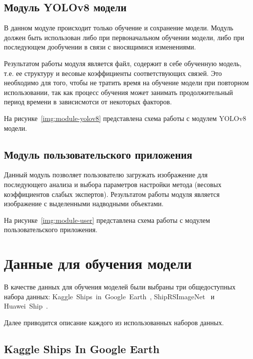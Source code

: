 \subsection*{Модуль YOLOv8 модели}

В данном модуле происходит только обучение и сохранение модели. Модуль должен быть использован либо при первоначальном обучении модели, либо при последующем дообучении в связи с вносящимися изменениями.

Результатом работы модуля является файл, содержит в себе обученную модель, т.е. ее структуру и весовые коэффициенты соответствующих связей. Это необходимо для того, чтобы не тратить время на обучение модели при повторном использовании, так как процесс обучения может занимать продолжительный период времени в зависисмотси от некоторых факторов.

На рисунке~\ref{img:module-yolov8} представлена схема работы с модулем YOLOv8 модели.



\subsection*{Модуль пользовательского приложения}

Данный модуль позволяет пользователю загружать изображение для последующего анализа и выбора параметров настройки метода (весовых коэффициентов слабых экспертов). Результатом работы модуля является изображение с выделенными надводными объектами.

На рисунке~\ref{img:module-user} представлена схема работы с модулем пользовательского приложения.


\section{Данные для обучения модели}

В качестве данных для обучения моделей были выбраны три общедоступных набора данных: Kaggle~Ships~in~Google~Earth~\cite{kaggle-ships-in-google-earth-dfqwt_dataset}, ShipRSImageNet~\cite{shiprs-imagenet} и Huawei~Ship~\cite{huawei_ship_dataset}.

Далее приводится описание каждого из использованных наборов данных.

\subsection*{Kaggle Ships In Google Earth}

